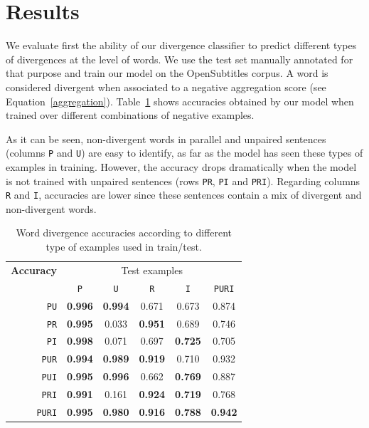 \documentclass[11pt,a4paper]{article}
\begin{document}
\section{Results}
\label{sec:results}

We evaluate first the ability of our divergence classifier to predict different types of divergences at the level of words. 
We use the test set manually annotated for that purpose and train our model on the OpenSubtitles corpus.
A word is considered divergent when associated to a negative aggregation score (see Equation~\ref{aggregation}).
Table~\ref{results_puri} shows accuracies obtained by our model when trained over different combinations of negative examples.

As it can be seen, non-divergent words in parallel and unpaired sentences (columns \texttt{P} and \texttt{U}) are easy to identify, as far as the model has seen these types of examples in training. 
However, the accuracy drops dramatically when the model is not trained with unpaired sentences (rows  \texttt{PR}, \texttt{PI} and \texttt{PRI}).
Regarding columns \texttt{R} and \texttt{I}, accuracies are lower since these sentences contain a mix of divergent and non-divergent words. 

\begin{table}[h]
\small
\center
\begin{tabular}{crccccc}
\hline
\multicolumn{2}{l}{\bf Accuracy} & \multicolumn{5}{c}{Test examples} \\
 &  & \texttt{P} & \texttt{U} & \texttt{R} & \texttt{I} & \texttt{PURI} \\
 \hline
\parbox[t]{0mm}{} &  \texttt{PU}     & \bf 0.996 & \bf 0.994 & 0.671 & 0.673 & 0.874 \\
 &  \texttt{PR}     & \bf 0.995 &      0.033 & \bf 0.951 &      0.689 & 0.746 \\
 &  \texttt{PI}       & \bf 0.998 &      0.071 &      0.697 & \bf 0.725 & 0.705 \\
 &  \texttt{PUR}  & \bf 0.994 & \bf 0.989 & \bf 0.919 &      0.710 & 0.932 \\
 &  \texttt{PUI}    & \bf 0.995 & \bf 0.996 &      0.662 & \bf 0.769 & 0.887 \\
 &  \texttt{PRI}    & \bf 0.991 &      0.161 & \bf 0.924 & \bf 0.719 & 0.768 \\
 &  \texttt{PURI} & \bf 0.995 & \bf 0.980 & \bf 0.916 & \bf 0.788 & \bf 0.942 \\
\hline
\end{tabular}
\caption{Word divergence accuracies according to different type of examples used in train/test.}
\label{results_puri}
\end{table}
\end{document}
